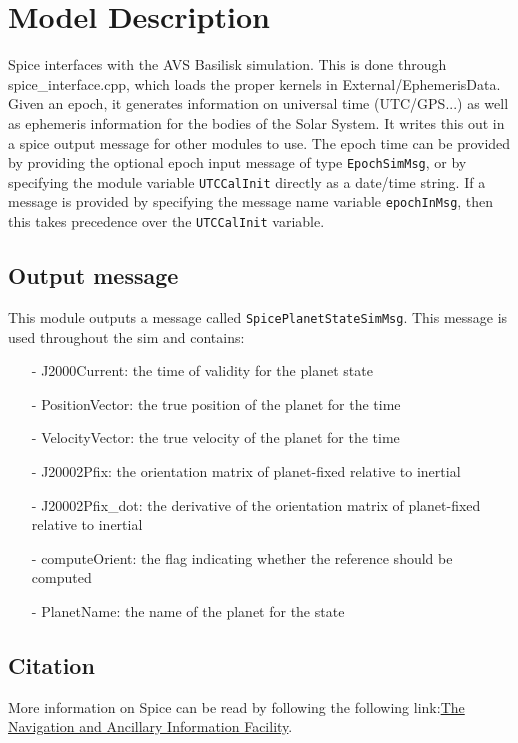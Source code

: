 \section{Model Description}


Spice interfaces with the AVS Basilisk simulation. This is done through spice\_interface.cpp, which loads the proper kernels in External/EphemerisData. Given an epoch, it generates information on universal time (UTC/GPS...) as well as ephemeris information for the bodies of the Solar System. It writes this out in a spice output message for other modules to use.  The epoch time can be provided by providing the optional epoch input message of type {\tt EpochSimMsg}, or by specifying the module variable {\tt UTCCalInit} directly as a date/time string.  If a message is provided by specifying the message name variable {\tt epochInMsg}, then this takes precedence over the {\tt UTCCalInit} variable.

\subsection{Output message}

This module outputs a message called \texttt{SpicePlanetStateSimMsg}. This message is used throughout the sim and contains:

\begin{itemize}
    \item[-] J2000Current: the time of validity for the planet state
    \item[-] PositionVector: the true position of the planet for the time
    \item[-] VelocityVector: the true velocity of the planet for the time
    \item[-] J20002Pfix: the orientation matrix of planet-fixed relative to inertial
    \item[-] J20002Pfix\_dot: the derivative of the orientation matrix of planet-fixed relative to inertial
    \item[-] computeOrient: the flag indicating whether the reference should be computed
    \item[-] PlanetName: the name of the planet for the state
\end{itemize}

\subsection{Citation}

More information on Spice can be read by following the following link:\href{ \underline{https://naif.jpl.nasa.gov/naif/spiceconcept.html}}{The Navigation and Ancillary Information Facility}. 

